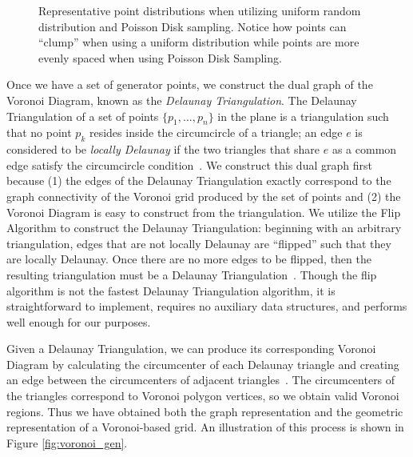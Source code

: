 \documentclass[a4paper,11pt]{article}
\begin{document}
\begin{figure}[htp]
\caption[Random Point Generation]{
  Representative point distributions when utilizing uniform random distribution and Poisson Disk sampling. Notice how points can ``clump'' when using a uniform distribution while points are more evenly spaced when using Poisson Disk Sampling.
}
\label{fig:pt_gen}
\end{figure}

Once we have a set of generator points, we construct the dual graph of the Voronoi Diagram, known as the \textit{Delaunay Triangulation}. The Delaunay Triangulation of a set of points $\{p_1, ..., p_n\}$ in the plane is a triangulation such that no point $p_k$ resides inside the circumcircle of a triangle; an edge $e$ is considered to be \textit{locally Delaunay} if the two triangles that share $e$ as a common edge satisfy the circumcircle condition~\cite{de11}. We construct this dual graph first because (1) the edges of the Delaunay Triangulation exactly correspond to the graph connectivity of the Voronoi grid produced by the set of points and (2) the Voronoi Diagram is easy to construct from the triangulation. We utilize the {\sc Flip Algorithm} to construct the Delaunay Triangulation: beginning with an arbitrary triangulation, edges that are not locally Delaunay are ``flipped'' such that they are locally Delaunay. Once there are no more edges to be flipped, then the resulting triangulation must be a Delaunay Triangulation~\cite{ed08}. Though the flip algorithm is not the fastest Delaunay Triangulation algorithm, it is straightforward to implement, requires no auxiliary data structures, and performs well enough for our purposes.

Given a Delaunay Triangulation, we can produce its corresponding Voronoi Diagram by calculating the circumcenter of each Delaunay triangle and creating an edge between the circumcenters of adjacent triangles~\cite{de11,ed08}. The circumcenters of the triangles correspond to Voronoi polygon vertices, so we obtain valid Voronoi regions. Thus we have obtained both the graph representation and the geometric representation of a Voronoi-based grid. An illustration of this process is shown in Figure \ref{fig:voronoi_gen}.
\end{document}
